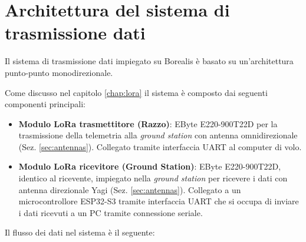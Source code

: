 \documentclass[12pt,a4paper,twoside]{book}
\begin{document}

\section{Architettura del sistema di trasmissione dati}
Il sistema di trasmissione dati impiegato su Borealis è basato su un'architettura
punto-punto monodirezionale.

Come discusso nel capitolo \ref{chap:lora} il sistema è composto dai seguenti componenti principali:
\begin{itemize}
    \item \textbf{Modulo \ac{LoRa} trasmettitore (Razzo)}: EByte E220-900T22D per
          la trasmissione della telemetria alla \emph{ground station} con antenna
          omnidirezionale (Sez. \ref{sec:antennas}).
          Collegato tramite interfaccia \ac{UART} al computer di volo.
    \item \textbf{Modulo \ac{LoRa} ricevitore (Ground Station)}: EByte E220-900T22D,
          identico al ricevente, impiegato nella \emph{ground station} per
          ricevere i dati con antenna direzionale Yagi (Sez. \ref{sec:antennas}).
          Collegato a un microcontrollore ESP32-S3 tramite interfaccia \ac{UART}
          che si occupa di inviare i dati ricevuti a un PC tramite connessione seriale.
\end{itemize}

Il flusso dei dati nel sistema è il seguente:
\end{document}
